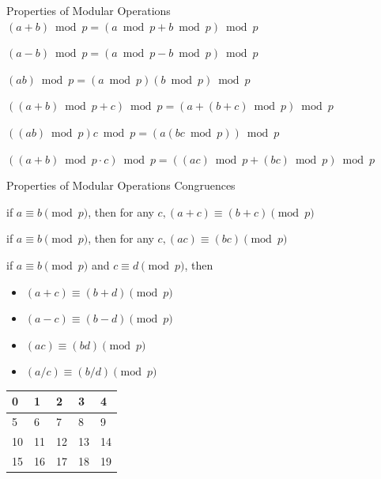 \documentclass{beamer}
\begin{document}
\begin{frame}{Properties of Modular Operations}
	$(a + b) \bmod p = (a \bmod p + b \bmod p) \bmod p$

	$(a - b) \bmod p = (a \bmod p - b \bmod p) \bmod p$

	$(a  b) \bmod p = (a \bmod p)   (b \bmod p) \bmod p$

	$((a + b) \bmod p + c) \bmod p = (a + (b + c) \bmod p) \bmod p$

	$((a  b) \bmod p)  c \bmod p = (a  (b  c \bmod p)) \bmod p$

	$((a +b) \bmod p \cdot c) \bmod p = ((a  c) \bmod p + (b  c) \bmod p) \bmod p $
\end{frame}

\begin{frame}{Properties of Modular Operations}
	\alert{Congruences}

	if $a \equiv b \pmod p$, then for any $c, (a + c) \equiv (b + c) \pmod p$

	if $a \equiv b \pmod p$, then for any $c, (a  c) \equiv (b  c) \pmod p$

	if $a \equiv b \pmod p$ and $c \equiv d \pmod p$, then
	\begin{itemize}
		\item	$(a + c) \equiv (b + d) \pmod p$
		\item	$(a - c) \equiv (b - d) \pmod p$
		\item   $(a  c) \equiv (b  d) \pmod p$
		\item   $(a / c) \equiv (b / d) \pmod p$
	\end{itemize}

	\begin{table}[]
		\begin{tabular}{|l|l|l|l|l|}
			\hline
			0  & 1  & 2  & 3  & 4  \\ \hline
			5  & 6  & 7  & 8  & 9  \\ \hline
			10 & 11 & 12 & 13 & 14 \\ \hline
			15 & 16 & 17 & 18 & 19 \\ \hline
		\end{tabular}
	\end{table}
\end{frame}
\end{document}
